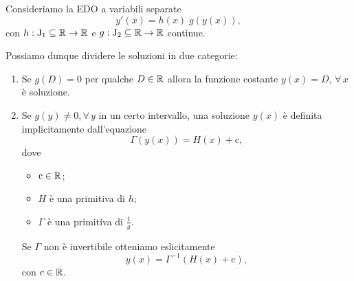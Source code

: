 \documentclass[../../dimostrazioni]{subfiles}
\begin{document}
        \begin{teorema}
            Consideriamo la EDO a variabili separate
            \[
                y'(x) = h(x) \; g(y(x)),
            \]
            con \(h : \mathrm{J}_1 \subseteq \mathbb{R} \to \mathbb{R}\) e \(g : \mathrm{J}_2 \subseteq \mathbb{R} \to \mathbb{R}\) continue.

            Possiamo dunque dividere le soluzioni in due categorie:
            \begin{enumerate}
                \item Se \(g(D) = 0\) per qualche \(D \in \mathbb{R}\) allora la funzione costante \(y(x) = D, \, \forall \, x\) è soluzione.
                \item Se \(g(y) \neq 0, \forall \, y\) in un certo intervallo, una soluzione \(y(x)\) è definita implicitamente
                    dall'equazione
                    \[
                        \Gamma(y(x)) = H(x) + \mathrm{c},
                    \]
                    dove
                    \begin{itemize}
                        \item \(\mathrm{c} \in \mathbb{R}\);
                        \item \(H\) è una primitiva di \(h\);
                        \item \(\Gamma\) è una primitiva di \(\frac{1}{g}\).
                    \end{itemize}

                    Se \(\Gamma\) non è invertibile otteniamo eslicitamente
                    \[
                        y(x) = \Gamma^{-1}(H(x) + \mathrm{c}),
                    \]
                    con \(c \in \mathbb{R}\).
            \end{enumerate}
        \end{teorema}
        \newpage
\end{document}
